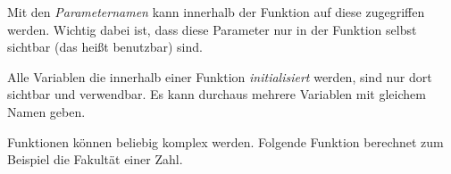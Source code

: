 \documentclass[c_worksheet.tex]{subfiles}
\begin{document}
 

Mit den \emph{Parameternamen} kann innerhalb der Funktion auf diese zugegriffen werden. Wichtig dabei ist, dass diese Parameter nur in der Funktion selbst sichtbar (das heißt benutzbar) sind.

Alle Variablen die innerhalb einer Funktion \emph{initialisiert} werden, sind nur dort sichtbar und verwendbar. Es kann durchaus mehrere Variablen mit gleichem Namen geben.

 

Funktionen können beliebig komplex werden. Folgende Funktion berechnet zum Beispiel die Fakultät einer Zahl.

 
\end{document}
